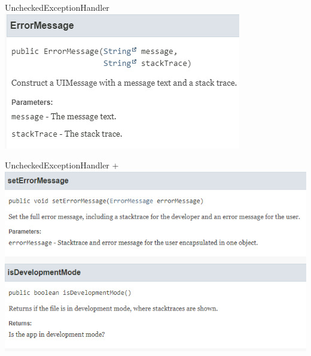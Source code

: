 \documentclass{beamer}
\begin{document}
    \begin{frame}{UncheckedExceptionHandler}
        \centering
        \includegraphics[height=0.5\textheight]{graphics/exc/doc_errormsg}
    \end{frame}
    \begin{frame}{UncheckedExceptionHandler}
        +
        \centering
        \includegraphics[height=0.6\textheight]{graphics/exc/doc_backing}
    \end{frame}

\end{document}
